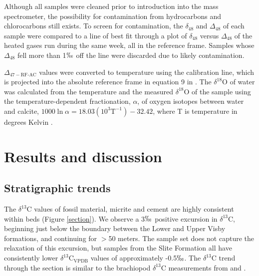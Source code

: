 \documentclass[5p, authoryear]{elsarticle}
\begin{document}
Although all samples were cleaned prior to introduction into the mass spectrometer, the possibility for contamination from hydrocarbons and chlorocarbons still exists. To screen for contamination, the $\delta_{48}$ and $\Delta_{48}$ of each sample were compared to a line of best fit through a plot of $\delta_{48}$ versus $\Delta_{48}$ of the heated gases run during the same week, all in the \cite{Ghosh2006} reference frame. Samples whose $\Delta_{48}$ fell more than 1$\permil$ off the line were discarded due to likely contamination. 

$\Delta_{47-\text{RF-AC}}$ values were converted to temperature using the \cite{Ghosh2006} calibration line, which is projected into the absolute reference frame in equation 9 in \cite{Dennis2011}. The $\delta^{18}$O of water was calculated from the temperature and the measured $\delta^{18}$O of the sample using the temperature-dependent fractionation, $\alpha$, of oxygen isotopes between water and calcite, $1000\ln\alpha=18.03(10^3\text{T}^{-1})-32.42$, where T is temperature in degrees Kelvin \citep{Kim1997}. 

\section{Results and discussion}

\subsection{Stratigraphic trends}

The $\delta^{13}$C values of fossil material, micrite and cement are highly consistent within beds (Figure \ref{section}). We observe a 3$\permil$ positive excursion in $\delta^{13}$C, beginning just below the boundary between the Lower and Upper Visby formations, and continuing for $>$50 meters. The sample set does not capture the relaxation of this excursion, but samples from the Slite Formation all have consistently lower $\delta^{13}$C$_{\text{VPDB}}$ values of approximately -0.5$\permil$. The $\delta^{13}$C trend through the section is similar to the brachiopod $\delta^{13}$C measurements from \cite{Bickert1997} and \cite{Munnecke2003}. 
\end{document}
